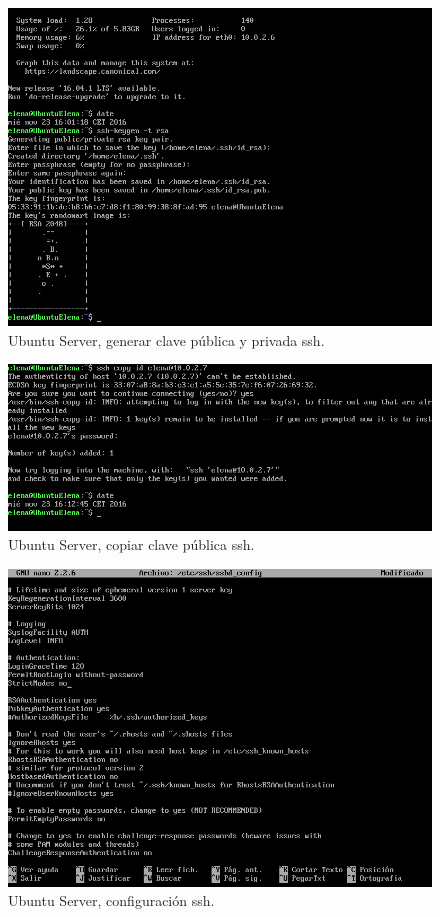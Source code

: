 \begin{figure}[H] 
	\centering
	\includegraphics[width=15cm]{./img/ejercicio6-1.png} 	
	\caption{Ubuntu Server, generar clave pública y privada ssh.} \label{fig:ejercicio6-1}
\end{figure}

\begin{figure}[H] 
	\centering
	\includegraphics[width=15cm]{./img/ejercicio6-2.png} 	
	\caption{Ubuntu Server, copiar clave pública ssh.} \label{fig:ejercicio6-2}
\end{figure}

\begin{figure}[H] 
	\centering
	\includegraphics[width=15cm]{./img/ejercicio6-3.png} 	
	\caption{Ubuntu Server, configuración ssh.} \label{fig:ejercicio6-3}
\end{figure}

